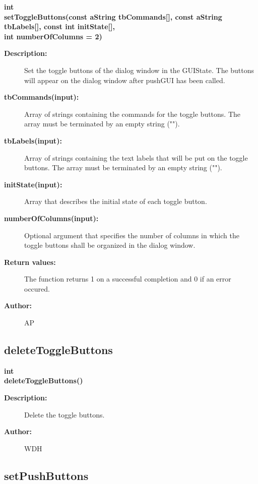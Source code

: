 \begin{flushleft} \textbf{%
int  \\ 
\settowidth{\DialogDataIncludeArgIndent}{setToggleButtons(}%
setToggleButtons(const aString tbCommands[], const aString tbLabels[], const int initState[], \\ 
\hspace{\DialogDataIncludeArgIndent}int numberOfColumns  = 2)
}\end{flushleft}
\begin{description}
\item[{\bf Description:}]  Set the toggle buttons of the dialog window in the GUIState. The buttons
 will appear on the dialog window after pushGUI has been called.

\item[{\bf tbCommands(input):}]  Array of strings containing the commands for the toggle buttons. 
   The array must be terminated by an empty string ("").
\item[{\bf tbLabels(input):}]  Array of strings containing the text labels that will be put on
   the toggle buttons. The array must be terminated by an empty string ("").
\item[{\bf initState(input):}]  Array that describes the initial state of each toggle button.
\item[{\bf numberOfColumns(input):}]  Optional argument that specifies the number of columns in which the 
   toggle buttons shall be organized in the dialog window.
\item[{\bf Return values:}]  The function returns 1 on a successful completion and 0 if an error occured.
\item[{\bf Author:}]  AP
\end{description}
\subsection{deleteToggleButtons}
 
\begin{flushleft} \textbf{%
int  \\ 
\settowidth{\DialogDataIncludeArgIndent}{deleteToggleButtons(}%
deleteToggleButtons()
}\end{flushleft}
\begin{description}
\item[{\bf Description:}]  Delete the toggle buttons.
\item[{\bf Author:}]  WDH 
\end{description}
\subsection{setPushButtons}
 

